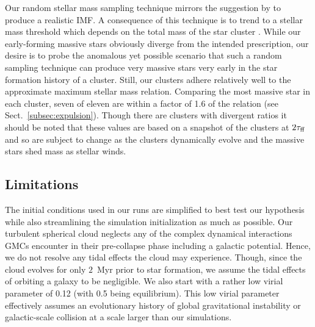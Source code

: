\documentclass[twoside]{drexel-thesis}
\begin{document}
\begin{thesis}
Our random stellar mass sampling technique mirrors the suggestion by \citet{weidner_maximum_2006} to produce a realistic IMF. A consequence of this technique is to trend to a stellar mass threshold which depends on the total mass of the star cluster \citep{larson_stellar_2003}. While our early-forming massive stars obviously diverge from the intended prescription, our desire is to probe the anomalous yet possible scenario that such a random sampling technique can produce very massive stars very early in the star formation history of a cluster. Still, our clusters adhere relatively well to the \citet{larson_stellar_2003} approximate maximum stellar mass relation. Comparing the most massive star in each cluster, seven of eleven are within a factor of 1.6 of the \citet{larson_stellar_2003} relation (see Sect.~\ref{subsec:expulsion}). Though there are clusters with divergent ratios it should be noted that these values are based on a snapshot of the clusters at $2\tau_{\rm ff}$ and so are subject to change as the clusters dynamically evolve and the massive stars shed mass as stellar winds.

\subsection{Limitations}
The initial conditions used in our runs are simplified to best test our hypothesis while also streamlining the simulation initialization as much as possible. Our turbulent spherical cloud neglects any of the complex dynamical interactions GMCs encounter in their pre-collapse phase including a galactic potential. Hence, we do not resolve any tidal effects the cloud may experience. Though, since the cloud evolves for only $2$~Myr prior to star formation, we assume the tidal effects of orbiting a galaxy to be negligible. We also start with a rather low virial parameter of 0.12 (with 0.5 being equilibrium). This low virial parameter effectively assumes an evolutionary history of global gravitational instability or galactic-scale collision at a scale larger than our simulations. 


\end{thesis}
\end{document}
